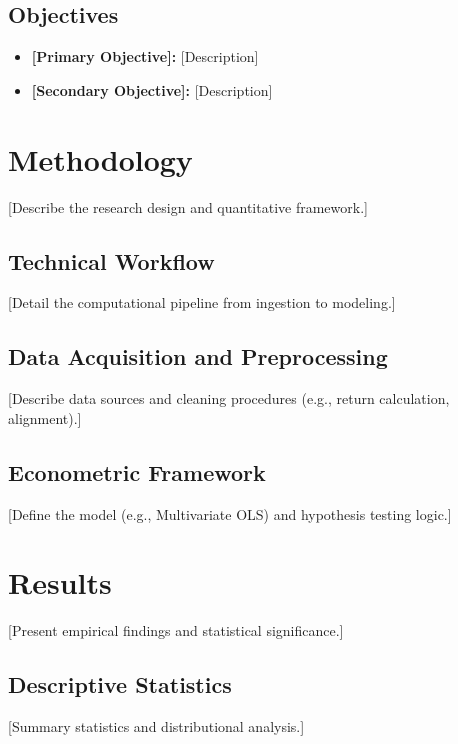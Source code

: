 \subsection{Objectives}
\begin{itemize}
    \item \textbf{[Primary Objective]:} [Description]
    \item \textbf{[Secondary Objective]:} [Description]
\end{itemize}

\section{Methodology}
{} [Describe the research design and quantitative framework.]

\subsection{Technical Workflow}
{} [Detail the computational pipeline from ingestion to modeling.]

\subsection{Data Acquisition and Preprocessing}
{} [Describe data sources and cleaning procedures (e.g., return calculation, alignment).]

\subsection{Econometric Framework}
{} [Define the model (e.g., Multivariate OLS) and hypothesis testing logic.]

\section{Results}
{} [Present empirical findings and statistical significance.]

\subsection{Descriptive Statistics}
{} [Summary statistics and distributional analysis.]

